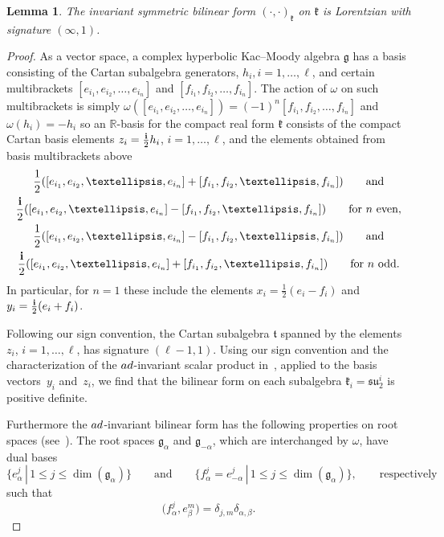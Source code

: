 \documentclass[11pt]{article}
\numberwithin{equation}{section}
\numberwithin{equation}{section}
\newtheorem{Lemma}[Theorem]{Lemma}
\def\R{\mathbb{R}}
\def\bi{{\bf i}}
\def\g{\mathfrak{g}}
\def\k{\mathfrak{k}}
\def\ft{\mathfrak{t}}
\def\fsu{\mathfrak{su}}
\begin{document}
\begin{Lemma}
The invariant symmetric bilinear form $(\cdot,\cdot)_{\k}$ on $\k$ is Lorentzian with signature $(\infty,1)$.
\end{Lemma}

\begin{proof} As a vector space, a complex hyperbolic Kac--Moody algebra $\g$ has a basis consisting of the Cartan subalgebra
generators, $h_i, i=1,\dots, \ell$, and certain multibrackets $[e_{i_1},e_{i_2},\dots,e_{i_n}]$ and $[f_{i_1},f_{i_2},\dots,f_{i_n}]$.
The action of $\omega$ on such multibrackets is simply $\omega([e_{i_1},e_{i_2},\dots,e_{i_n}]) = (-1)^n [f_{i_1},f_{i_2},\dots,f_{i_n}]$
and $\omega(h_i) = -h_i$ so an $\R$-basis for the compact real form $\k$ consists of the compact Cartan basis elements
$z_i =\frac{\bi}{2}h_i$, $i=1,\dots, \ell$, and the elements obtained from basis multibrackets above
\begin{gather*}
\frac{1}{2} ([e_{i_1},e_{i_2},\dots,e_{i_n}] + [f_{i_1},f_{i_2},\dots,f_{i_n}] ) \qquad \text{and}\\
 \frac{\bi}{2} ([e_{i_1},e_{i_2},\dots,e_{i_n}] - [f_{i_1},f_{i_2},\dots,f_{i_n}] )\qquad \text{for $n$ even},\\
\frac{1}{2} ([e_{i_1},e_{i_2},\dots,e_{i_n}] - [f_{i_1},f_{i_2},\dots,f_{i_n}] ) \qquad \text{and}\\
 \frac{\bi}{2} ([e_{i_1},e_{i_2},\dots,e_{i_n}] + [f_{i_1},f_{i_2},\dots,f_{i_n}] )\qquad \text{for $n$ odd}.
\end{gather*}
In particular, for $n = 1$ these include the elements $x_i=\frac{1}{2}(e_i-f_i)$ and
$y_i=\frac{\bi}{2}(e_i+f_i)$.

Following our sign convention, the Cartan subalgebra $\ft$ spanned by the elements $z_i$, $i=1,\dots, \ell$, has signature $(\ell-1,1)$. Using our sign convention and the characterization of the ${\rm ad}$-invariant scalar product in~\cite[equation~(2.2.1)]{Kac90}, applied to the basis vectors~$y_i$ and~$z_i$, we find that the bilinear form on each subalgebra $\k_i=\fsu_2^i$ is positive definite.

Furthermore the ${\rm ad}$-invariant bilinear form has the following properties on root spaces (see~\cite[Sections~2.1 and~2.2]{Kac90}). The root spaces $\g_{\alpha}$ and $\g_{-\alpha}$, which are interchanged by $\omega$, have dual bases
 \[\big\{e_{\alpha}^{j}\, |\, 1\leq j\leq \dim (\g_{\alpha})\big\} \qquad \text{and} \qquad
 \big\{f_{\alpha}^{j} = e_{-\alpha}^{j}\, |\, 1\leq j\leq \dim (\g_{\alpha}) \big\}, \qquad \text{respectively}\]
 such that
\[\big( f_{\alpha}^j, e_{\beta}^m\big) =\delta_{j,m}\delta_{\alpha, \beta} .\]


\end{proof}
\end{document}
